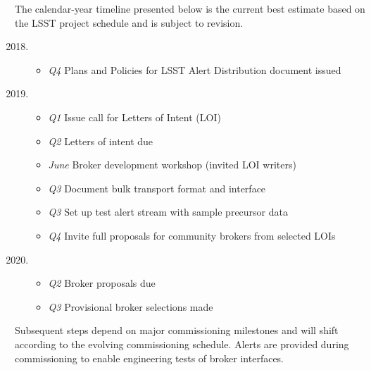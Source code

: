 The calendar-year timeline presented below is the current best estimate based on the LSST project schedule and is subject to revision.
{
	\renewcommand\labelenumi{\textbf{\theenumi}}
\begin{enumerate}
  \setcounter{enumi}{2017}
	\item \begin{itemize} %
		\item \textit{Q4} Plans and Policies for LSST Alert Distribution document issued
	\end{itemize}
	\item \begin{itemize}%
		\item \textit{Q1} Issue call for Letters of Intent (LOI)
		\item \textit{Q2} Letters of intent due
		\item \textit{June} Broker development workshop (invited LOI writers)
		\item \textit{Q3} Document bulk transport format and interface
		\item \textit{Q3} Set up test alert stream with sample precursor data
		\item \textit{Q4} Invite full proposals for community brokers from selected LOIs
		\end{itemize}
	\item \begin{itemize} %
		\item \textit{Q2} Broker proposals due
		\item \textit{Q3} Provisional broker selections made
		\end{itemize}
\end{enumerate}
}

Subsequent steps depend on major commissioning milestones and will shift according to the evolving commissioning schedule.
Alerts are provided during commissioning to enable engineering tests of broker interfaces.


